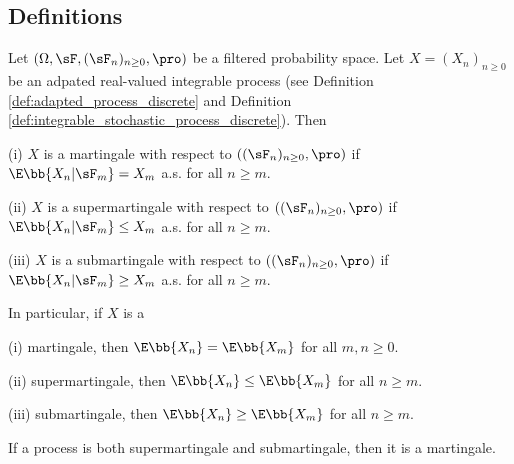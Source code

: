 \subsection{Definitions}

\begin{definition}\label{def:martingale_super_sub_discrete}
Let $(\Omega,\sF, (\sF_n)_{n\geq 0},\pro)$ be a filtered probability space. Let $X = (X_n)_{n\geq 0}$ be an adpated real-valued integrable process (see Definition \ref{def:adapted_process_discrete} and Definition \ref{def:integrable_stochastic_process_discrete}). Then
\ben
\item [(i)] $X$ is a martingale with respect to $((\sF_n)_{n\geq 0},\pro)$ if $\E\bb{X_n | \sF_m} = X_m$ a.s. for all $n \geq m$.
\item [(ii)] $X$ is a supermartingale with respect to $((\sF_n)_{n\geq 0},\pro)$ if $\E\bb{X_n | \sF_m}\leq X_m$ a.s. for all $n\geq m$.
\item [(iii)] $X$ is a submartingale with respect to $((\sF_n)_{n\geq 0},\pro)$ if $\E\bb{X_n | \sF_m} \geq X_m$ a.s. for all $n\geq m$.
\een

In particular, if $X$ is a
\ben
\item [(i)] martingale, then $\E\bb{X_n} = \E\bb{X_m}$ for all $m,n\geq 0$.
\item [(ii)] supermartingale, then $\E\bb{X_n} \leq \E\bb{X_m}$ for all $n\geq m$.
\item [(iii)] submartingale, then $\E\bb{X_n} \geq \E\bb{X_m}$ for all $n\geq m$.
\een
\end{definition}

\begin{remark}
If a process is both supermartingale and submartingale, then it is a martingale.
\end{remark}




